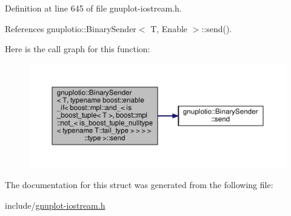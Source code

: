 Definition at line 645 of file gnuplot-\/iostream.\+h.



References gnuplotio\+::\+Binary\+Sender$<$ T, Enable $>$\+::send().

Here is the call graph for this function\+:\nopagebreak
\begin{figure}[H]
\begin{center}
\leavevmode
\includegraphics[width=350pt]{structgnuplotio_1_1_binary_sender_3_01_t_00_01typename_01boost_1_1enable__if_3_01boost_1_1mpl_1_916ff7a758aa0b8917fd3b30ff275f06_a90bdbe9d299646a871882da19fdb30a9_cgraph}
\end{center}
\end{figure}


The documentation for this struct was generated from the following file\+:\begin{DoxyCompactItemize}
\item 
include/\hyperlink{gnuplot-iostream_8h}{gnuplot-\/iostream.\+h}\end{DoxyCompactItemize}
